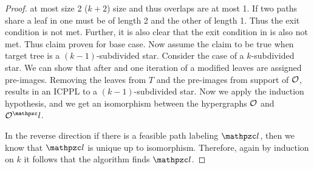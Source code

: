 \begin{proof}
  at most size 2 ($k+2$) size and thus overlaps are at most 1. If two
  paths share a leaf in \filteri one must be of length 2 and the other
  of length 1. Thus the exit condition is not met. Further, it is also
  clear that the exit condition in \filterii is also not met. Thus
  claim proven for base case.  Now assume the claim to be true when
  target tree is a $(k-1)$-subdivided star. Consider the case of a
  $k$-subdivided star.  We can show that after \filteri and one
  iteration of a modified  leaves are assigned
  pre-images.  Removing the leaves from $T$ and the pre-images from
  support of ${\cal O}$, results in an ICPPL to a $(k-1)$-subdivided star.
  Now we apply the induction hypothesis, and we get an isomorphism
  between the hypergraphs ${\cal O}$ and $\cO^\cl$.

  \noindent
  In the reverse direction if there is a feasible path labeling $\cl$,
  then we know that $\cl$ is unique up to isomorphism.  Therefore,
  again by induction on $k$ it follows that the algorithm finds $\cl$.
\end{proof}


%
%




